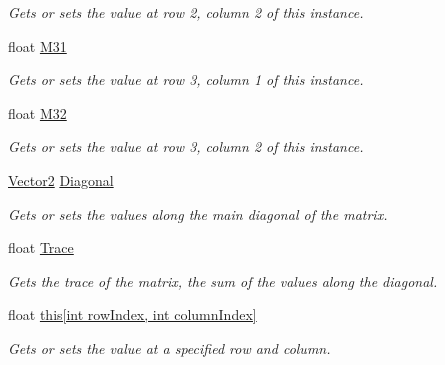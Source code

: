 \begin{DoxyCompactItemize}
\begin{DoxyCompactList}\small\item\em Gets or sets the value at row 2, column 2 of this instance. \end{DoxyCompactList}\item 
float \hyperlink{struct_open_t_k_1_1_matrix3x2_a83b5221557ba7fd25b9d590973578156}{M31}
\begin{DoxyCompactList}\small\item\em Gets or sets the value at row 3, column 1 of this instance. \end{DoxyCompactList}\item 
float \hyperlink{struct_open_t_k_1_1_matrix3x2_abac8e7ce5710ff968911a4c2e9405bb6}{M32}
\begin{DoxyCompactList}\small\item\em Gets or sets the value at row 3, column 2 of this instance. \end{DoxyCompactList}\item 
\hyperlink{struct_open_t_k_1_1_vector2}{Vector2} \hyperlink{struct_open_t_k_1_1_matrix3x2_af454457ad7c8805f13571e03ee4303a8}{Diagonal}
\begin{DoxyCompactList}\small\item\em Gets or sets the values along the main diagonal of the matrix. \end{DoxyCompactList}\item 
float \hyperlink{struct_open_t_k_1_1_matrix3x2_ae527c0fc1113137ebae8e066f971131e}{Trace}
\begin{DoxyCompactList}\small\item\em Gets the trace of the matrix, the sum of the values along the diagonal. \end{DoxyCompactList}\item 
float \hyperlink{struct_open_t_k_1_1_matrix3x2_a54506beefaa89d50f476ae06e9383040}{this\mbox{[}int row\-Index, int column\-Index\mbox{]}}
\begin{DoxyCompactList}\small\item\em Gets or sets the value at a specified row and column. \end{DoxyCompactList}\end{DoxyCompactItemize}


